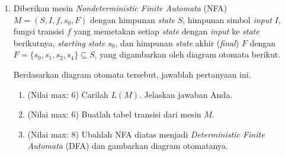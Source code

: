 \documentclass{article}
\begin{document}
\begin{enumerate}
    \item Diberikan mesin \textit{Nondeterministic Finite Automata} (NFA) $M = (S, I, f, s_0, F)$ dengan himpunan \textit{state} $S$, himpunan simbol \textit{input} $I$, fungsi transisi $f$ yang memetakan setiap \textit{state} dengan \textit{input} ke \textit{state} berikutnya, \textit{starting state} $s_0$, dan himpunan \textit{state} akhir (\textit{final}) $F$ dengan $F = \{s_0, s_1, s_2, s_4\} \subseteq S$, yang digambarkan oleh diagram otomata berikut.
    

    Berdasarkan diagram otomata tersebut, jawablah pertanyaan ini.
    
    \begin{enumerate}
        \item (Nilai max: 6) Carilah $L(M)$. Jelaskan jawaban Anda.
        
        \item (Nilai max: 6) Buatlah tabel transisi dari mesin $M$.
        
        \item (Nilai max: 8) Ubahlah NFA diatas menjadi \textit{Deterministic Finite Automata} (DFA) dan gambarkan diagram otomatanya.
    \end{enumerate}
\end{enumerate}

\end{document}
